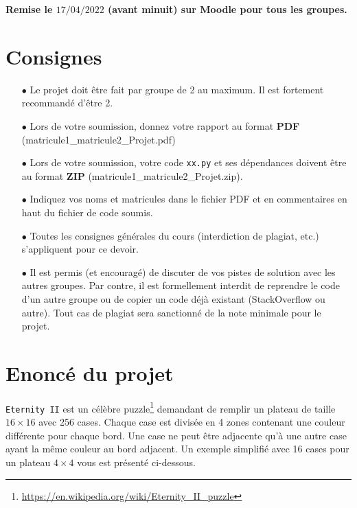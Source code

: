 \documentclass[a4paper,11pt,final,fleqn]{article}
\begin{document}
\printtitle


\textbf{Remise le $17/04/2022$ (avant minuit) sur Moodle pour tous les groupes.}

\section*{Consignes}

\begin{itemize}
      \item[$\bullet$]  Le projet doit être fait par groupe de 2 au maximum. Il est
            fortement recommandé d'être 2.
      \item[$\bullet$] Lors de votre soumission, donnez votre rapport
            au format \textbf{PDF} (matricule1\_matricule2\_Projet.pdf)
      \item[$\bullet$] Lors de votre soumission, votre code \texttt{xx.py} et ses dépendances doivent être au format \textbf{ZIP} (matricule1\_matricule2\_Projet.zip).
      \item[$\bullet$] Indiquez vos noms et matricules dans le fichier PDF et en commentaires en haut du fichier de code soumis.
      \item[$\bullet$] Toutes les consignes générales du cours (interdiction de
            plagiat, etc.) s'appliquent pour ce devoir.
      \item[$\bullet$] Il est permis (et encouragé) de discuter de vos pistes de solution avec les autres groupes. Par contre, il est formellement interdit de reprendre le code d'un autre groupe ou de copier un code déjà existant (StackOverflow ou autre). Tout cas de plagiat sera sanctionné de la note minimale pour le projet.
\end{itemize}


\section*{Enoncé du projet}

\texttt{Eternity II} est un célèbre puzzle\footnote{\url{https://en.wikipedia.org/wiki/Eternity_II_puzzle}} demandant de remplir un plateau de taille $16\times 16$ avec 256 cases. Chaque case est divisée en 4 zones contenant une couleur différente pour chaque bord. 
Une case ne peut être adjacente qu'à une autre case ayant la même couleur au bord adjacent. Un exemple simplifié avec 16 cases pour un plateau $4\times 4$ vous est présenté ci-dessous.
\end{document}
